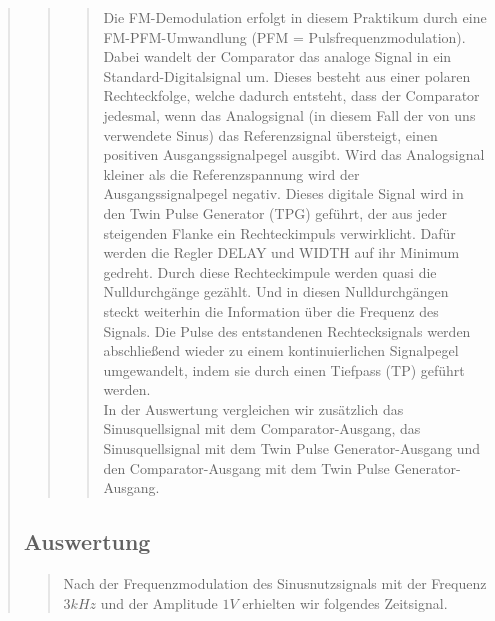 \begin{quote}
\begin{quote}
\begin{quote}
        Die FM-Demodulation erfolgt in diesem Praktikum durch eine FM-PFM-Umwandlung (PFM = Pulsfrequenzmodulation).
        Dabei wandelt der Comparator das analoge Signal in ein Standard-Digitalsignal um. Dieses besteht aus einer
        polaren Rechteckfolge, welche dadurch entsteht, dass der Comparator jedesmal, wenn das Analogsignal (in diesem
        Fall der von uns verwendete Sinus) das Referenzsignal übersteigt, einen positiven Ausgangssignalpegel ausgibt.
        Wird das Analogsignal kleiner als die Referenzspannung wird der Ausgangssignalpegel negativ. Dieses digitale
        Signal wird in den Twin Pulse Generator (TPG) geführt, der aus jeder steigenden Flanke ein Rechteckimpuls
        verwirklicht. Dafür werden die Regler DELAY und WIDTH auf ihr Minimum gedreht. Durch diese Rechteckimpule werden
        quasi die Nulldurchgänge gezählt. Und in diesen Nulldurchgängen steckt weiterhin die Information über die
        Frequenz des Signals. Die Pulse des entstandenen Rechtecksignals werden abschließend wieder zu einem
        kontinuierlichen Signalpegel umgewandelt, indem sie durch einen Tiefpass (TP) geführt werden.\\
        
        In der Auswertung vergleichen wir zusätzlich das Sinusquellsignal mit dem Comparator-Ausgang, das
        Sinusquellsignal mit dem Twin Pulse Generator-Ausgang und den Comparator-Ausgang mit dem Twin Pulse
        Generator-Ausgang.
         
        \end{quote}
        
    \end{quote}
    
    \subsection{Auswertung}
    \begin{quote}
    
        Nach der Frequenzmodulation des Sinusnutzsignals mit der Frequenz 
        $3 kHz$ und der Amplitude $1 V$ erhielten wir folgendes Zeitsignal.
    	
             \begin{figure}[H] \centering
                   

\end{figure}
\end{quote}
\end{quote}
